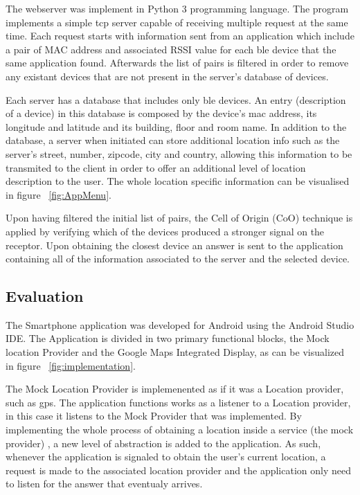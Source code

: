 \documentclass[a4paper]{IEEEtran}
\begin{document}
The webserver was implement in Python 3 programming language. The program implements a simple tcp server capable of receiving multiple request at the same time. Each request starts with information sent from an application which include a pair of MAC address and associated RSSI value for each ble device that the same application found. Afterwards the list of pairs is filtered in order to remove any existant devices that are not present in the server's database of devices.

Each server has a database that includes only ble devices. An entry (description of a device) in this database is composed by the device's mac address, its longitude and latitude and its building, floor and room name. In addition to the database, a server when initiated can store additional location info such as the server's street, number, zipcode, city and country, allowing this information to be transmited to the client in order to offer an additional level of location description to the user. The whole location specific information can be visualised in figure ~\ref{fig:AppMenu}.

Upon having filtered the initial list of pairs, the Cell of Origin (CoO) technique is applied by verifying which of the devices produced a stronger signal on the receptor. Upon obtaining the closest device an answer is sent to the application containing all of the information associated to the server and the selected device.

\subsection{Evaluation}
\label{sec:eval}

The Smartphone application was developed for Android using the Android Studio IDE. The Application is divided in two primary functional blocks, the Mock location Provider and the Google Maps Integrated Display, as can be visualized in figure ~\ref{fig:implementation}.

The Mock Location Provider is implemenented as if it was a Location provider, such as gps. The application functions works as a listener to a Location provider, in this case it listens to the Mock Provider that was implemented. By implementing the whole process of obtaining a location inside a service (the mock provider) , a new level of abstraction is added to the application. As such, whenever the application is signaled to obtain the user's current location, a request is made to the associated location provider and the application only need to listen for the answer that eventualy arrives.
\end{document}
